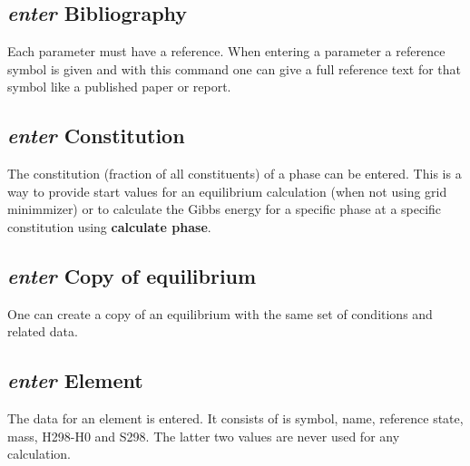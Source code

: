 \documentclass[12pt]{article}
\begin{document}
\subsection{{\em enter} Bibliography}

Each parameter must have a reference.  When entering a parameter a
reference symbol is given and with this command one can give a full
reference text for that symbol like a published paper or report.

\subsection{{\em enter} Constitution}

The constitution (fraction of all constituents) of a phase can be
entered.  This is a way to provide start values for an equilibrium
calculation (when not using grid minimmizer) or to calculate the Gibbs
energy for a specific phase at a specific constitution using {\bf
  calculate phase}.

\subsection{{\em enter} Copy of equilibrium}

One can create a copy of an equilibrium with the same set of
conditions and related data.

\subsection{{\em enter} Element}

The data for an element is entered.  It consists of is symbol, name,
reference state, mass, H298-H0 and S298.  The latter two values are 
never used for any calculation.
\end{document}
